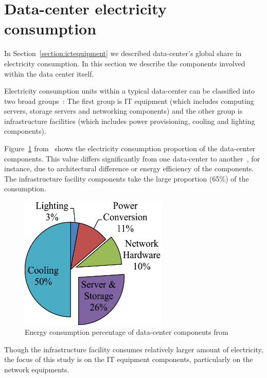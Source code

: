 \section {Data-center electricity consumption}
\label{section:datacenter} 
In Section~\ref{section:ictequipment} we described data-center's global share in electricity consumption. In this section we describe the components involved within the data center itself.

Electricity consumption units within a typical data-center can be classified into two broad groups~\cite{DBLP:journals/comsur/DayarathnaWF16}: The first group is IT equipment (which includes computing servers, storage servers and networking components) and the other group is infrastructure facilities (which includes power provisioning, cooling and lighting components).

Figure~\ref{fig:datacenterenergy} from~\cite{DBLP:journals/comsur/DayarathnaWF16} shows the electricity consumption proportion of the data-center components. This value differs significantly from one data-center to another~\cite{DBLP:series/synthesis/2013Barroso}, for instance, due to architectural difference\cite{DBLP:conf/eenergy/GyarmatiT10} or energy efficiency of the components. The infrastructure facility components take the large proportion (65\%) of the consumption. 
\begin{figure}[ht]
	\begin{center}
		\includegraphics[width=7cm]{images/datacenterenergy.pdf}
		\caption{Energy consumption percentage of data-center components from~\cite{DBLP:journals/comsur/DayarathnaWF16}}
		\label{fig:datacenterenergy}
	\end{center}
\end{figure}
Though the infrastructure facility consumes relatively larger amount of electricity, the focus of this study is on the IT equipment components, particularly on the network equipments. 

